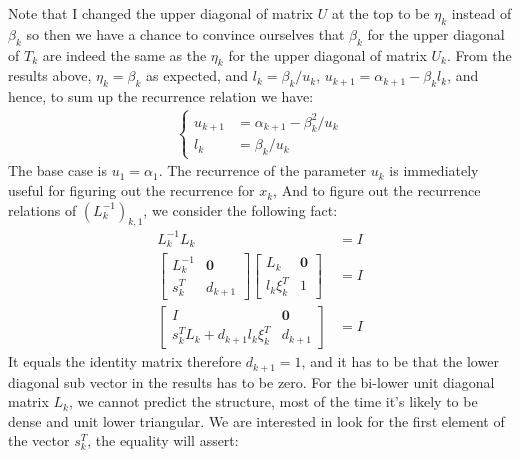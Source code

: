 \documentclass[]{article}
\theoremstyle{definition}
\begin{document}
\begin{appendices}
            Note that I changed the upper diagonal of matrix $U$ at the top to be $\eta_k$ instead of $\beta_k$ so then we have a chance to convince ourselves that $\beta_k$ for the upper diagonal of $T_k$ are indeed the same as the $\eta_k$ for the upper diagonal of matrix $U_k$. From the results above, $\eta_k = \beta_k$ as expected, and $l_k = \beta_k/u_k$, $u_{k + 1} = \alpha_{k +1} - \beta_{k}l_k$, and hence, to sum up the recurrence relation we have: 
            \begin{align}
                \begin{cases}
                    u_{k + 1} &= \alpha_{k + 1} - \beta_k^2/u_k
                    \\
                    l_k &= \beta_k/u_k
                \end{cases}
            \end{align}
            The base case is $u_1 = \alpha_1$. The recurrence of the parameter $u_k$ is immediately useful for figuring out the recurrence for $x_k$, And to figure out the recurrence relations of $(L^{-1}_k)_{k, 1}$, we consider the following fact: 
            \begin{align}
                L^{-1}_k L_k &= I 
                \\
                \begin{bmatrix}
                    L^{-1}_k & \mathbf{0} \\
                    s_k^T & d_{k + 1}
                \end{bmatrix}
                \begin{bmatrix}
                    L_k & \mathbf{0} \\
                    l_k \xi_k^T & 1
                \end{bmatrix} &= I
                \\
                \begin{bmatrix}
                    I & \mathbf{0} \\ 
                    s_k^TL_k + d_{k + 1}l_k \xi_k^T &d_{k + 1}
                \end{bmatrix} &= I
            \end{align}
            It equals the identity matrix therefore $d_{k + 1} = 1$, and it has to be that the lower diagonal sub vector in the results has to be zero. For the bi-lower unit diagonal matrix $L_k$, we cannot predict the structure, most of the time it's likely to be dense and unit lower triangular. We are interested in look for the first element of the vector $s_k^T$, the equality will assert: 

\end{appendices}
\end{document}
